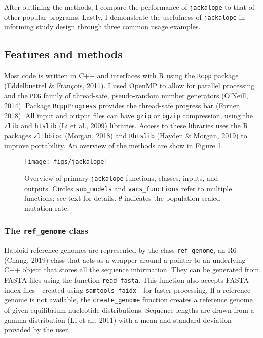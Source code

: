 \documentclass[12pt,]{article}
\begin{document}
After outlining the methods, I compare the performance of \texttt{jackalope} to that of
other popular programs.
Lastly, I demonstrate the usefulness of \texttt{jackalope} in informing study design
through three common usage examples.

\hypertarget{features-and-methods}{%
\subsection{Features and methods}\label{features-and-methods}}

Most code is written in C++ and interfaces with R using the \texttt{Rcpp} package
(Eddelbuettel \& François, 2011).
I used OpenMP to allow for parallel processing and
the \texttt{PCG} family of thread-safe, pseudo-random number generators
(O'Neill, 2014).
Package \texttt{RcppProgress} provides the thread-safe progress bar
(Forner, 2018).
All input and output files can have \texttt{gzip} or \texttt{bgzip} compression, using the
\texttt{zlib} and
\texttt{htslib} (Li et al., 2009) libraries.
Access to these libraries uses the R packages
\texttt{zlibbioc} (Morgan, 2018) and
\texttt{Rhtslib} (Hayden \& Morgan, 2019)
to improve portability.
An overview of the methods are show in Figure \ref{fig:jackalope-overview}.

\begin{figure}
\texttt{[image: figs/jackalope]}
\caption{Overview of primary \texttt{jackalope} functions, classes, inputs, and outputs.
  Circles \texttt{sub\_models} and \texttt{vars\_functions} refer to multiple
  functions; see text for details.
  \(\theta\) indicates the population-scaled mutation rate.}
\label{fig:jackalope-overview}
\end{figure}

\hypertarget{the-ref_genome-class}{%
\subsubsection{\texorpdfstring{The \texttt{ref\_genome} class}{The ref\_genome class}}\label{the-ref_genome-class}}

Haploid reference genomes are represented by the class \texttt{ref\_genome}, an
R6 (Chang, 2019) class that acts as a wrapper around a pointer to
an underlying C++ object that stores all the sequence information.
They can be generated from FASTA files using the function \texttt{read\_fasta}.
This function also accepts FASTA index files---created using
\texttt{samtools\ faidx}---for faster processing.
If a reference genome is not available, the \texttt{create\_genome} function creates
a reference genome of given equilibrium nucleotide distributions.
Sequence lengths are drawn from a gamma distribution (Li et al., 2011)
with a mean and standard deviation provided by the user.
\end{document}
